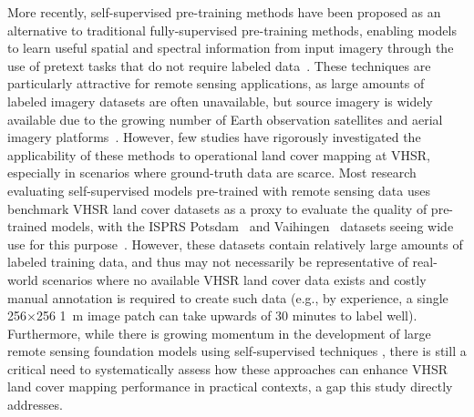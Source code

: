More recently, self-supervised pre-training methods have been proposed as an alternative to traditional fully-supervised pre-training methods, enabling models to learn useful spatial and spectral information from input imagery through the use of pretext tasks that do not require labeled data~\citep{wuUnsupervisedFeatureLearning2018,tianContrastiveMultiviewCoding2020, chenSimpleFrameworkContrastive2020}.
These techniques are particularly attractive for remote sensing applications, as large amounts of labeled imagery datasets are often unavailable, but source imagery is widely available due to the growing number of Earth observation satellites and aerial imagery platforms~\citep{luVisionFoundationModels2025}.
However, few studies have rigorously investigated the applicability of these methods to operational land cover mapping at VHSR, especially in scenarios where ground-truth data are scarce.
Most research evaluating self-supervised models pre-trained with remote sensing data uses benchmark VHSR land cover datasets as a proxy to evaluate the quality of pre-trained models, with the ISPRS Potsdam~\citep{2DSemanticLabeling} and Vaihingen~\citep{2DSemanticLabel} datasets seeing wide use for this purpose~\citep{sunRingMoRemoteSensing2023, wangMTPAdvancingRemote2024, guoSkySenseMultiModalRemote2024, wangAdvancingPlainVision2023}.
However, these datasets contain relatively large amounts of labeled training data, and thus may not necessarily be representative of real-world scenarios where no available VHSR land cover data exists and costly manual annotation is required to create such data (e.g., by experience, a single 256\(\times\)256 \SI{1}{\meter} image patch can take upwards of 30 minutes to label well).
Furthermore, while there is growing momentum in the development of large remote sensing foundation models using self-supervised techniques \citep{xiaoFoundationModelsRemote2025,luVisionFoundationModels2025}, there is still a critical need to systematically assess how these approaches can enhance VHSR land cover mapping performance in practical contexts, a gap this study directly addresses.

